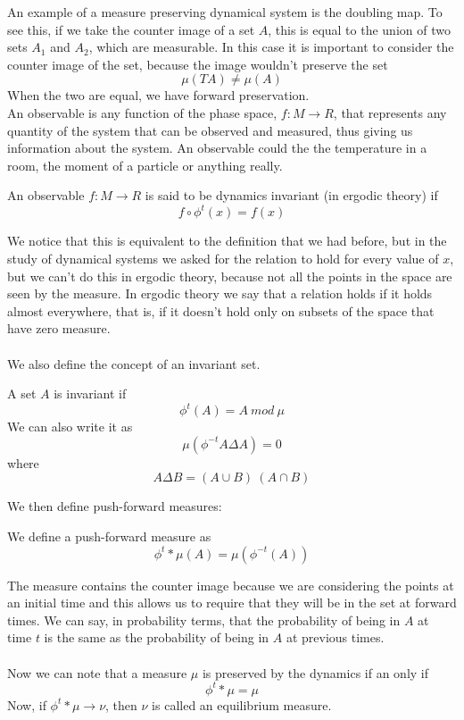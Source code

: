 An example of a measure preserving dynamical system is the doubling map. To see this, if we take the counter image of a set $A$, this is equal to the union of two sets $A_1$ and $A_2$, which are measurable. In this case it is important to consider the counter image of the set, because the image wouldn't preserve the set
$$
	\mu(TA) \neq \mu(A)
$$
When the two are equal, we have forward preservation. \\
An observable is any function of the phase space, $f:M \rightarrow R$, that represents any quantity of the system that can be observed and measured, thus giving us information about the system. An observable could the the temperature in a room, the moment of a particle or anything really.
\begin{definition}
	An observable $f:M \rightarrow R$ is said to be dynamics invariant (in ergodic theory) if
	$$
		f \circ \phi^t(x) = f(x)
	$$
\end{definition}
We notice that this is equivalent to the definition that we had before, but in the study of dynamical systems we asked for the relation to hold for every value of $x$, but we can't do this in ergodic theory, because not all the points in the space are seen by the measure. In ergodic theory we say that a relation holds if it holds almost everywhere, that is, if it doesn't hold only on subsets of the space that have zero measure. \\ \\
We also define the concept of an invariant set.
\begin{definition}
	A set $A$ is invariant if
	$$
		\phi^t(A) = A \ mod \ \mu
	$$
	We can also write it as
	$$
		\mu(\phi^{-t}A \Delta A) = 0
	$$
	where 
	$$
		A \Delta B = (A\cup B) \ (A \cap B)
	$$
\end{definition}
We then define push-forward measures:
\begin{definition}
	We define a push-forward measure as
	$$
		\phi^t * \mu(A) = \mu(\phi^{-t}(A))
	$$
\end{definition}
The measure contains the counter image because we are considering the points at an initial time and this allows us to require that they will be in the set at forward times. We can say, in probability terms, that the probability of being in $A$ at time $t$ is the same as the probability of being in $A$ at previous times. \\ \\	
Now we can note that a measure $\mu$ is preserved by the dynamics if an only if
$$
	\phi^t * \mu = \mu
$$
Now, if $\phi^t * \mu \rightarrow \nu$, then $\nu$ is called an equilibrium measure.
